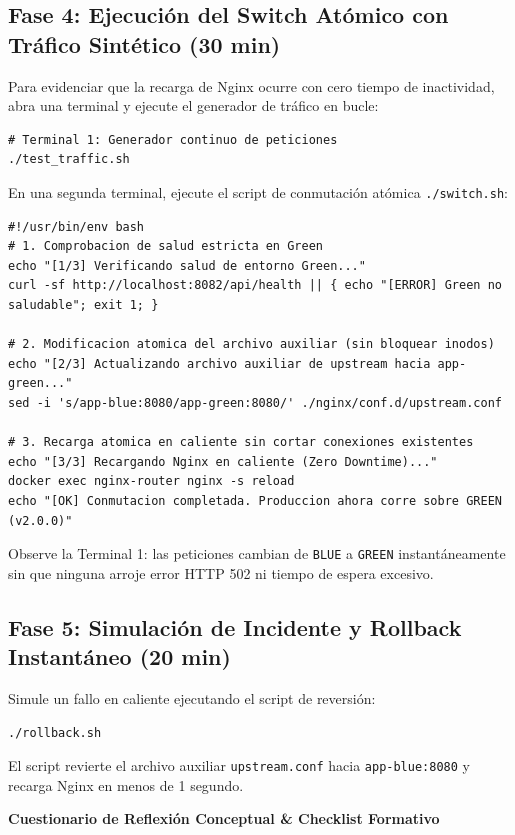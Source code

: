 \documentclass[10pt,letterpaper]{article}
\newcommand{\sectionBadge}[1]{%
  \refstepcounter{section}%
  \vspace{0.16cm}%
  \noindent%
  \colorbox{icesiBlue}{\color{white}\rule[-0.08cm]{0pt}{0.42cm}\hspace{0.16cm}\textbf{\normalsize \thesection}\hspace{0.16cm}}%
  \hspace{0.18cm}%
  {\fontsize{9.5}{12}\selectfont\textbf{\color{icesiDark}#1}}\\[-0.10cm]%
  \noindent{\color{icesiDark}\rule{\textwidth}{0.8pt}}\vspace{0.06cm}%
}
\begin{document}
\subsection{Fase 4: Ejecución del Switch Atómico con Tráfico Sintético (30 min)}
Para evidenciar que la recarga de Nginx ocurre con cero tiempo de inactividad, abra una terminal y ejecute el generador de tráfico en bucle:
\begin{lstlisting}[style=bashstyle]
# Terminal 1: Generador continuo de peticiones
./test_traffic.sh
\end{lstlisting}

En una segunda terminal, ejecute el script de conmutación atómica \texttt{./switch.sh}:
\begin{lstlisting}[style=bashstyle]
#!/usr/bin/env bash
# 1. Comprobacion de salud estricta en Green
echo "[1/3] Verificando salud de entorno Green..."
curl -sf http://localhost:8082/api/health || { echo "[ERROR] Green no saludable"; exit 1; }

# 2. Modificacion atomica del archivo auxiliar (sin bloquear inodos)
echo "[2/3] Actualizando archivo auxiliar de upstream hacia app-green..."
sed -i 's/app-blue:8080/app-green:8080/' ./nginx/conf.d/upstream.conf

# 3. Recarga atomica en caliente sin cortar conexiones existentes
echo "[3/3] Recargando Nginx en caliente (Zero Downtime)..."
docker exec nginx-router nginx -s reload
echo "[OK] Conmutacion completada. Produccion ahora corre sobre GREEN (v2.0.0)"
\end{lstlisting}
Observe la Terminal 1: las peticiones cambian de \texttt{BLUE} a \texttt{GREEN} instantáneamente sin que ninguna arroje error HTTP 502 ni tiempo de espera excesivo.

\subsection{Fase 5: Simulación de Incidente y Rollback Instantáneo (20 min)}
Simule un fallo en caliente ejecutando el script de reversión:
\begin{lstlisting}[style=bashstyle]
./rollback.sh
\end{lstlisting}
El script revierte el archivo auxiliar \texttt{upstream.conf} hacia \texttt{app-blue:8080} y recarga Nginx en menos de 1 segundo.

\newpage

\sectionBadge{Cuestionario de Reflexión Conceptual \& Checklist Formativo}
\end{document}
